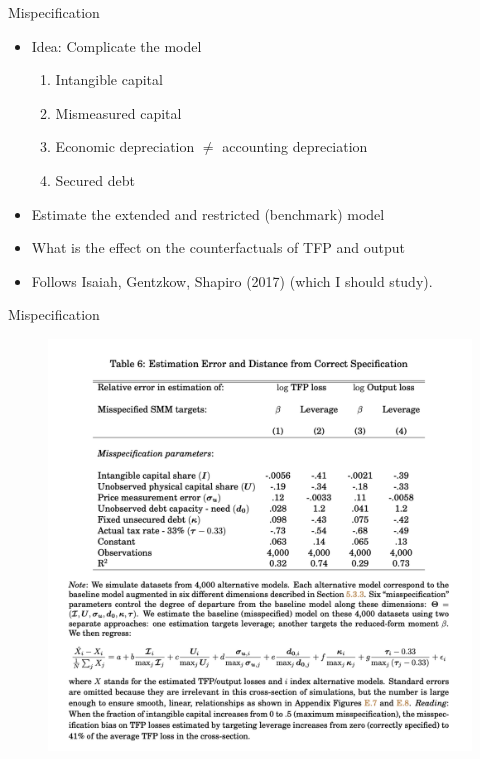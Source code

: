 \documentclass[english,xcolor=svgnames]{beamer}
\begin{document}
\begin{frame}{Mispecification}
\begin{itemize}
\item Idea: Complicate the model
\begin{enumerate}
\item Intangible capital
\item Mismeasured capital
\item Economic depreciation $\neq$ accounting depreciation
\item Secured debt
\end{enumerate}
\item Estimate the extended and restricted (benchmark) model
\item What is the effect on the counterfactuals of TFP and output
\item Follows Isaiah, Gentzkow, Shapiro (2017) (which I should study).
\end{itemize}
\end{frame}

\begin{frame}{Mispecification}
\begin{figure}
\includegraphics[scale=0.35]{figures/cchst_4}
\end{figure}
\end{frame}
\end{document}
